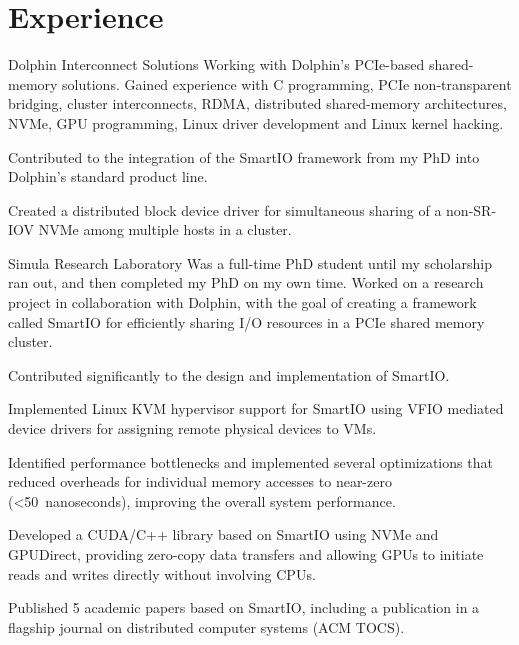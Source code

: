 \section{Experience}
\begin{experience}{Dolphin Interconnect Solutions}{
}
Working with Dolphin's PCIe-based shared-memory solutions. 
Gained experience with C programming, PCIe non-transparent bridging, cluster interconnects, RDMA, distributed shared-memory
architectures, NVMe, GPU programming, Linux driver development and Linux kernel hacking.
\begin{contribs}
    \item{Contributed to the integration of the SmartIO framework from my PhD into Dolphin's standard product line.}
	\item{Created a distributed block device driver for simultaneous sharing of a non-SR-IOV NVMe among multiple hosts in a cluster.}
\end{contribs}
\end{experience}


\begin{experience}{Simula Research Laboratory}{
}
Was a full-time PhD student until my scholarship ran out, and then completed my PhD on my own time.
Worked on a research project in collaboration with Dolphin, with the goal of creating a framework called SmartIO for efficiently sharing I/O resources in a PCIe shared memory cluster.%
\begin{contribs}
    \item{Contributed significantly to the design and implementation of SmartIO.}
	\item{Implemented Linux KVM hypervisor support for SmartIO using VFIO mediated device drivers
		for assigning remote physical devices to VMs.}
    \item{Identified performance bottlenecks and implemented several optimizations that reduced overheads for individual memory accesses to near-zero (\textless 50~nanoseconds), improving the overall system performance.}
	\item{Developed a CUDA/C++ library based on SmartIO using NVMe and GPUDirect, providing
		zero-copy data transfers and allowing GPUs to initiate reads and writes directly without involving CPUs.}
    \item{Published 5 academic papers based on SmartIO, including a publication in a flagship journal on distributed computer systems (ACM TOCS).}
\end{contribs}
\end{experience}


